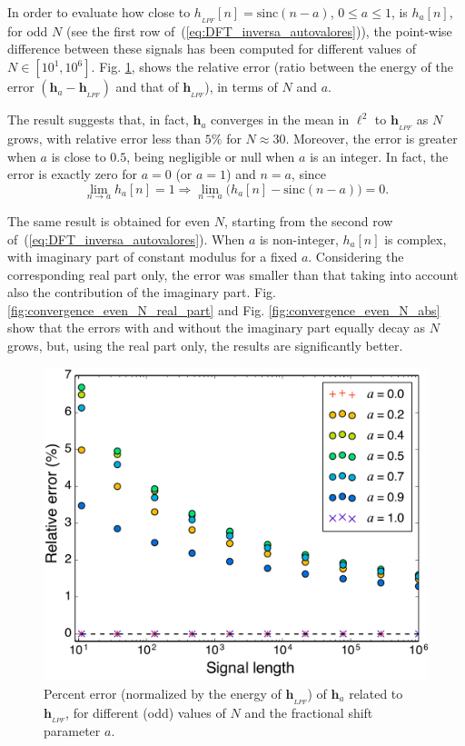 In order to evaluate how close to $ h_{_{LPF}}[n] = \mathrm{sinc} (n-a) $, $ 0\leq a \leq 1 $, is $h_a[n]$, for odd $N$ (see the first row of~(\ref{eq:DFT_inversa_autovalores})), the point-wise difference between these signals has been computed for different values of $ N \in [10^1, 10^6]$. Fig. \ref{fig:convergence}, shows the relative error (ratio between the energy of the error $(\mathbf{h}_a - \mathbf{h}_{_{LPF}})$ and that of $ \mathbf{h}_{_{LPF}} $), in terms of $ N $ and $a $.

The result suggests that, in fact, $ \mathbf{h}_a $ converges in the mean in $ \ell^2 $ to $ \mathbf{h}_{_{LPF}}$ as $ N $ grows, with relative error less than $ 5\% $ for $ N \approx 30 $. Moreover, the error is greater when $ a $ is close to $ 0{.}5 $, being negligible or null when $ a $ is an integer. In fact, the error is exactly zero for $ a=0$ (or $a=1$) and $ n = a $, since
\begin{equation}\label{eq:lim_h_impar}
\lim_{n \rightarrow a} h_{a}[n] = 1
\Rightarrow
\lim_{n \rightarrow a} \big(h_{a}[n] - \mathrm{sinc}(n-a)\big) = 0.
\end{equation}

The same result is obtained for even $N$, starting from the second row of~(\ref{eq:DFT_inversa_autovalores}). When $a$ is non-integer, $h_a[n] $ is complex, with imaginary part of constant modulus for a fixed $a$. Considering the corresponding real part only, the error was smaller than that taking into account also the contribution of the imaginary part. Fig. \ref{fig:convergence_even_N_real_part} and Fig. \ref{fig:convergence_even_N_abs} show that the errors with and without the imaginary part equally decay as  $ N $ grows, but, using the real part only, the results are significantly better.

\begin{figure}[ht!]
	\centering
	\includegraphics[width=0.5\linewidth]{Figures/convergence_odd_N_V4.pdf}
	\caption{Percent error (normalized by the energy of $ \mathbf{h}_{_{LPF}} $) of $ \mathbf{h}_a $ related to $ \mathbf{h}_{_{LPF}} $, for different (odd) values of $ N $ and the fractional shift parameter $ a $.}
	\label{fig:convergence}
\end{figure}

